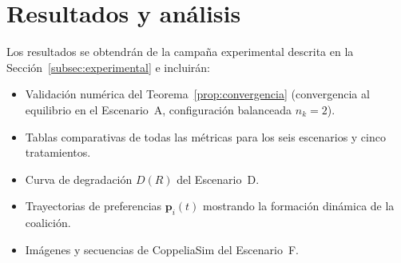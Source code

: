 ﻿%
\section{Resultados y análisis}
\label{sec:resultados}

Los resultados se obtendrán de la campaña experimental descrita en la
Sección~\ref{subsec:experimental} e incluirán:

\begin{itemize}
  \item Validación numérica del Teorema~\ref{prop:convergencia}
    (convergencia al equilibrio en el Escenario~A, configuración balanceada $n_k=2$).
  \item Tablas comparativas de todas las métricas para los seis escenarios y
    cinco tratamientos.
  \item Curva de degradación $D(R)$ del Escenario~D.
  \item Trayectorias de preferencias $\mathbf{p}_i(t)$ mostrando la formación
    dinámica de la coalición.
  \item Imágenes y secuencias de CoppeliaSim del Escenario~F.
\end{itemize}

